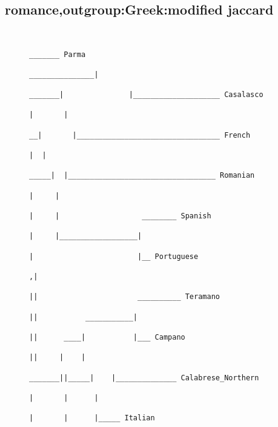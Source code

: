 \subsection{romance,outgroup:Greek:modified jaccard}
\begin{figure}[H]
\begin{center}
{
\selectfont
\begin{verbatim}

                                                                                                                     _______ Parma
                                                                                                     _______________|
                                                                                             _______|               |____________________ Casalasco
                                                                                            |       |
                                                                                          __|       |_________________________________ French
                                                                                         |  |
                                                                                    _____|  |__________________________________ Romanian
                                                                                   |     |
                                                                                   |     |                   ________ Spanish
                                                                                   |     |__________________|
                                                                                   |                        |__ Portuguese
                                                                                  ,|
                                                                                  ||                       __________ Teramano
                                                                                  ||           ___________|
                                                                                  ||      ____|           |___ Campano
                                                                                  ||     |    |
                                                                           _______||_____|    |______________ Calabrese_Northern
                                                                          |       |      |
                                                                          |       |      |_____ Italian

\end{verbatim}}
\end{center}
\end{figure}
